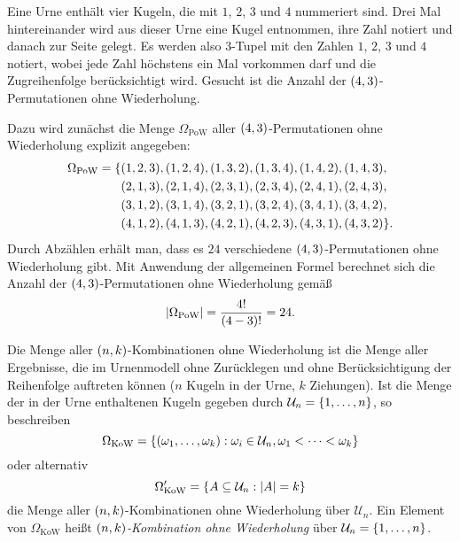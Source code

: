 \documentclass{lecture}
\begin{document}
    \begin{example}
        Eine Urne enthält vier Kugeln, die mit \(1\), \(2\), \(3\) und \(4\) nummeriert sind.
        Drei Mal hintereinander wird aus dieser Urne eine Kugel entnommen, ihre Zahl notiert und danach zur Seite gelegt.
        Es werden also \(3\)-Tupel mit den Zahlen \(1\), \(2\), \(3\) und \(4\) notiert, wobei jede Zahl höchstens ein Mal vorkommen darf und die Zugreihenfolge berücksichtigt wird.
        Gesucht ist die Anzahl der \(\parentheses*{4, 3}\)-Permutationen ohne Wiederholung.

        Dazu wird zunächst die Menge \(\Omega_{\text{PoW}}\) aller \(\parentheses*{4, 3}\)-Permutationen ohne Wiederholung explizit angegeben:
        \begin{align*}
            \Omega_{\text{PoW}} = \{&\parentheses*{1, 2, 3}, \parentheses*{1, 2, 4}, \parentheses*{1, 3, 2}, \parentheses*{1, 3, 4}, \parentheses*{1, 4, 2}, \parentheses*{1, 4, 3},\\
            &\parentheses*{2, 1, 3}, \parentheses*{2, 1, 4}, \parentheses*{2, 3, 1}, \parentheses*{2, 3, 4}, \parentheses*{2, 4, 1}, \parentheses*{2, 4, 3},\\
            &\parentheses*{3, 1, 2}, \parentheses*{3, 1, 4}, \parentheses*{3, 2, 1}, \parentheses*{3, 2, 4}, \parentheses*{3, 4, 1}, \parentheses*{3, 4, 2},\\
            &\parentheses*{4, 1, 2}, \parentheses*{4, 1, 3}, \parentheses*{4, 2, 1}, \parentheses*{4, 2, 3}, \parentheses*{4, 3, 1}, \parentheses*{4, 3, 2}\}.
        \end{align*}
        Durch Abzählen erhält man, dass es \(24\) verschiedene \(\parentheses*{4, 3}\)-Permutationen ohne Wiederholung gibt.
        Mit Anwendung der allgemeinen Formel berechnet sich die Anzahl der \(\parentheses*{4, 3}\)-Permutationen ohne Wiederholung gemäß
        \[
            \absolute*{\Omega_{\text{PoW}}} = \frac{4!}{\parentheses*{4 - 3}!} = 24.
        \]
    \end{example}

    \begin{definition}
        Die Menge aller \(\parentheses*{n, k}\)-Kombinationen ohne Wiederholung ist die Menge aller Ergebnisse, die im Urnenmodell ohne Zurücklegen und ohne Berücksichtigung der Reihenfolge auftreten können (\(n\) Kugeln in der Urne, \(k\) Ziehungen).
        Ist die Menge der in der Urne enthaltenen Kugeln gegeben durch \(\mathcal{U}_n = \braces*{1, \ldots, n}\), so beschreiben
        \[
            \Omega_{\text{KoW}} = \braces*{\parentheses*{\omega_1, \ldots, \omega_k} : \omega_i \in \mathcal{U}_n, \omega_1 < \cdots < \omega_k}
        \]
        oder alternativ
        \[
            \Omega_{\text{KoW}}' = \braces*{A \subseteq \mathcal{U}_n : \absolute*{A} = k}
        \]
        die Menge aller \(\parentheses*{n, k}\)-Kombinationen ohne Wiederholung über \(\mathcal{U}_n\).
        Ein Element von \(\Omega_{\text{KoW}}\) heißt \emph{\(\parentheses*{n, k}\)-Kombination ohne Wiederholung} über \(\mathcal{U}_n = \braces*{1, \ldots, n}\).
    \end{definition}
\end{document}
